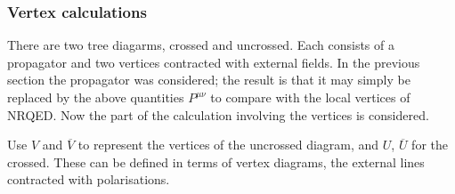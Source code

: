 \subsubsection{Vertex calculations}

There are two tree diagarms, crossed and uncrossed.  Each consists of a propagator and two vertices contracted with external fields.  In the previous section the propagator was considered; the result is that it may simply be replaced by the above quantities $P^{\mu\nu}$ to compare with the local vertices of NRQED.    Now the part of the calculation involving the vertices is considered.

Use $V$ and $\overline{V}$ to represent the vertices of the uncrossed diagram, and $U$, $\overline{U}$ for the crossed.  These can be defined in terms of vertex diagrams, the external lines contracted with polarisations.


